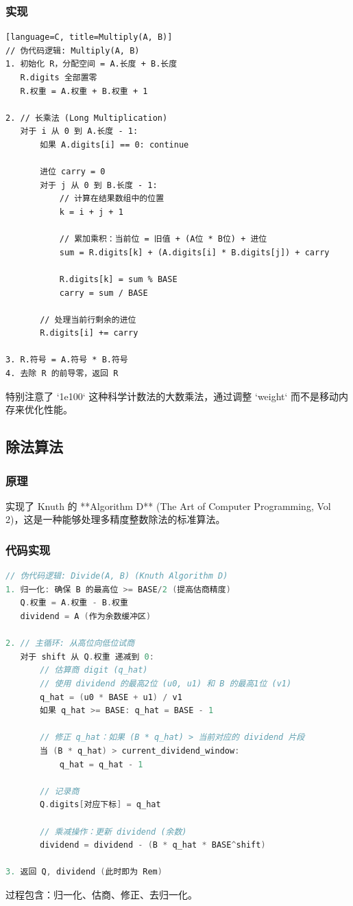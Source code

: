 \documentclass[UTF8]{ctexart}
\begin{document}
\subsubsection{实现}
\begin{lstlisting}[language=C, title=Multiply(A, B)]
// 伪代码逻辑: Multiply(A, B)
1. 初始化 R，分配空间 = A.长度 + B.长度
   R.digits 全部置零
   R.权重 = A.权重 + B.权重 + 1

2. // 长乘法 (Long Multiplication)
   对于 i 从 0 到 A.长度 - 1:
       如果 A.digits[i] == 0: continue
       
       进位 carry = 0
       对于 j 从 0 到 B.长度 - 1:
           // 计算在结果数组中的位置
           k = i + j + 1
           
           // 累加乘积：当前位 = 旧值 + (A位 * B位) + 进位
           sum = R.digits[k] + (A.digits[i] * B.digits[j]) + carry
           
           R.digits[k] = sum % BASE
           carry = sum / BASE
       
       // 处理当前行剩余的进位
       R.digits[i] += carry

3. R.符号 = A.符号 * B.符号
4. 去除 R 的前导零，返回 R
\end{lstlisting}
特别注意了 `1e100` 这种科学计数法的大数乘法，通过调整 `weight` 而不是移动内存来优化性能。

\subsection{除法算法}
\subsubsection{原理}
实现了 Knuth 的 **Algorithm D** (The Art of Computer Programming, Vol 2)，这是一种能够处理多精度整数除法的标准算法。
\subsubsection{代码实现}
\begin{lstlisting}[language=C, title=Divide(P / Q)]
// 伪代码逻辑: Divide(A, B) (Knuth Algorithm D)
1. 归一化: 确保 B 的最高位 >= BASE/2 (提高估商精度)
   Q.权重 = A.权重 - B.权重
   dividend = A (作为余数缓冲区)

2. // 主循环: 从高位向低位试商
   对于 shift 从 Q.权重 递减到 0:
       // 估算商 digit (q_hat)
       // 使用 dividend 的最高2位 (u0, u1) 和 B 的最高1位 (v1)
       q_hat = (u0 * BASE + u1) / v1
       如果 q_hat >= BASE: q_hat = BASE - 1
       
       // 修正 q_hat：如果 (B * q_hat) > 当前对应的 dividend 片段
       当 (B * q_hat) > current_dividend_window:
           q_hat = q_hat - 1
       
       // 记录商
       Q.digits[对应下标] = q_hat
       
       // 乘减操作：更新 dividend (余数)
       dividend = dividend - (B * q_hat * BASE^shift)

3. 返回 Q, dividend (此时即为 Rem)
\end{lstlisting}
过程包含：归一化、估商、修正、去归一化。
\end{document}
